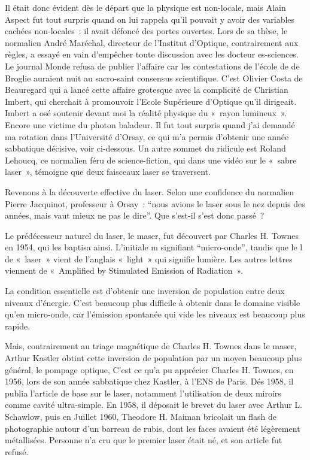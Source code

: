 \documentclass[a4paper,12pt]{article}
\begin{document}
Il était donc évident dès le départ que la physique est non-locale, mais Alain Aspect fut tout surpris quand on lui rappela qu'il pouvait y avoir des variables cachées non-locales : il avait défoncé des portes ouvertes. Lors de sa thèse, le normalien André Maréchal, directeur de l'Institut d'Optique, contrairement aux règles, a essayé en vain d'empêcher toute discussion avec les docteur es-sciences. Le journal Monde refusa de publier l'affaire car les contestations de l'école de de Broglie auraient nuit au sacro-saint consensus scientifique. C'est Olivier Costa de Beauregard qui a lancé cette affaire grotesque avec la complicité de Christian Imbert, qui cherchait à promouvoir l'Ecole Supérieure d'Optique qu'il dirigeait. Imbert a osé soutenir devant moi la réalité physique du « rayon lumineux ». Encore une victime du photon baladeur. Il fut tout surpris quand j'ai demandé ma rotation dans l'Université d'Orsay, ce qui m'a permis d'obtenir une année sabbatique décisive, voir ci-dessous. Un autre sommet du ridicule est Roland Lehoucq, ce normalien féru de science-fiction, qui dans une vidéo sur le « sabre laser », témoigne que deux faisceaux laser se traversent.

Revenons à la découverte effective du laser. Selon une confidence du normalien  Pierre Jacquinot, professeur à Orsay : ``nous avions le laser sous le nez depuis des années, mais vaut mieux ne pas le dire''. Que s'est-il s'est donc passé ?

Le prédécesseur naturel du laser, le maser, fut découvert par Charles H. Townes en 1954, qui les baptisa ainsi. L'initiale m signifiant ``micro-onde'', tandis que le l de « laser » vient de l'anglais « light » qui signifie lumière. Les autres lettres viennent de « Amplified by Stimulated Emission of Radiation ». 

La condition essentielle est d'obtenir une inversion de population entre deux niveaux d'énergie. C'est beaucoup plus difficile à obtenir dans le domaine visible qu'en micro-onde, car l'émission spontanée qui vide les niveaux est beaucoup plus rapide. 

Mais, contrairement au triage magnétique de Charles H. Townes dans le maser, Arthur Kastler obtint cette inversion de population par un moyen beaucoup plus général, le pompage optique,  C'est ce qu'a pu apprécier Charles H. Townes, en 1956, lors de son année sabbatique  chez Kastler, à l'ENS de Paris. Dés 1958, il publia l'article de base sur le laser, notamment l'utilisation de deux miroirs comme cavité ultra-simple. En 1958, il déposait le brevet du laser avec Arthur L. Schawlow, puis en Juillet 1960, Theodore H. Maiman bricolait un flash de photographie autour d'un barreau de rubis, dont les faces avaient été légèrement métallisées. Personne n'a cru que le premier laser était né, et son article fut refusé. 
\end{document}
